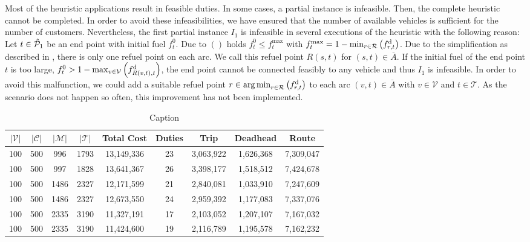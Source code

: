 Most of the heuristic applications result in feasible duties. In some cases, a partial instance is infeasible. Then, the complete heuristic cannot be completed. In order to avoid these infeasibilities, we have ensured that the number of available vehicles is sufficient for the number of customers. Nevertheless, the first partial instance $I_1$ is infeasible in several executions of the heuristic with the following reason: Let $t\in\hat{\mathcal{P}}_1$ be an end point with initial fuel $f^0_t$. Due to $()$ holds ${f^0_t\leq f^{\max}_t}$ with ${f^{\max}_t = 1 - \min_{r\in\mathcal{R}}\left(f^{\operatorname{d}}_{r,t}\right)}$. Due to the simplification as described in , there is only one refuel point on each arc. We call this refuel point $R(s,t)$ for ${(s,t)\in\overline{A}}$. If the initial fuel of the end point $t$ is too large, \ie ${f^0_t > 1 - \max_{v\in\mathcal{V}}\left(f^{\operatorname{d}}_{R(v,t),t}\right)}$, the end point cannot be connected feasibly to any vehicle and thus $I_1$ is infeasible. In order to avoid this malfunction, we could add a suitable refuel point ${r\in\operatorname*{arg\,min}_{r\in\mathcal{R}}\left(f^{\operatorname{d}}_{r,t}\right)}$ to each arc ${(v,t)\in\overline{A}}$ with ${v\in\mathcal{V}}$ and ${t\in\mathcal{T}}$. As the scenario does not happen so often, this improvement has not been implemented.



\begin{table}[htb]
	\centering
	\begin{tabular}{ccccccccc}
		\toprule
		$\vert\mathcal{V}\vert$ & $\vert\mathcal{C}\vert$ & $\vert\mathcal{M}\vert$ & $\vert\mathcal{T}\vert$ & Total Cost & Duties & Trip & Deadhead & Route \\
		\midrule
		100 & 500 &  996 & 1793 & 13,149,336 & 23 & 3,063,922 & 1,626,368 & 7,309,047 \\
		100 & 500 &  997 & 1828 & 13,641,367 & 26 & 3,398,177 & 1,518,512 & 7,424,678 \\
		100 & 500 & 1486 & 2327 & 12,171,599 & 21 & 2,840,081 & 1,033,910 & 7,247,609 \\
		100 & 500 & 1486 & 2327 & 12,673,550 & 24 & 2,959,392 & 1,177,083 & 7,337,076 \\
		100 & 500 & 2335 & 3190 & 11,327,191 & 17 & 2,103,052 & 1,207,107 & 7,167,032 \\
		100 & 500 & 2335 & 3190 & 11,424,600 & 19 & 2,116,789 & 1,195,578 & 7,162,232 \\
		\bottomrule
	\end{tabular}
	\caption{Caption}
\end{table}


